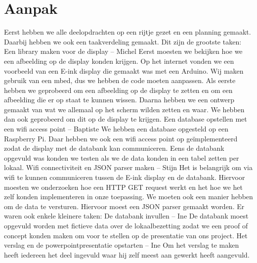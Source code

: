 \documentclass[a4paper,kul]{kulakarticle} %
\begin{document}
\section{Aanpak}

Eerst hebben we alle deelopdrachten op een rijtje gezet en een planning gemaakt. Daarbij hebben we ook een taakverdeling gemaakt. 
\newline
\newline
Dit zijn de grootste taken:
\newline
\newline
Een library maken voor de display – Michel
\newline
Eerst moesten we bekijken hoe we een afbeelding op de display konden krijgen. Op het internet vonden we een voorbeeld van een E-ink display die gemaakt was met een Arduino. Wij maken gebruik van een mbed, dus we hebben de code moeten aanpassen. 
Als eerste hebben we geprobeerd om een afbeelding op de display te zetten en om een afbeelding die er op staat te kunnen wissen.
Daarna hebben we een ontwerp gemaakt van wat we allemaal op het scherm wilden zetten en waar. We hebben dan ook geprobeerd om dit op de display te krijgen.
\newline
\newline
Een database opstellen met een wifi access point – Baptiste
\newline
We hebben een database opgesteld op een Raspberry Pi. Daar hebben we ook een wifi access point op geïmplementeerd zodat de display met de databank kan communiceren.
Eens de databank opgevuld was konden we testen als we de data konden in een tabel zetten per lokaal.
\newline
\newline
Wifi connectiviteit en JSON parser maken – Stijn
\newline
Het is belangrijk om via wifi te kunnen communiceren tussen de E-ink display en de databank. Hiervoor moesten we onderzoeken hoe een HTTP GET request werkt en het hoe we het zelf konden implementeren in onze toepassing.
\newline
We moeten ook een manier hebben om de data te versturen. Hiervoor moest een JSON parser gemaakt worden.
\newline
\newline
Er waren ook enkele kleinere taken:
\newline
\newline
De databank invullen – Ine
\newline
De databank moest opgevuld worden met fictieve data over de lokaalbezetting zodat we een proof of concept konden maken om voor te stellen op de presentatie van ons project.
\newline
\newline
Het verslag en de powerpointpresentatie opstarten – Ine 
\newline
Om het verslag te maken heeft iedereen het deel ingevuld waar hij zelf meest aan gewerkt heeft aangevuld. 
\end{document}
